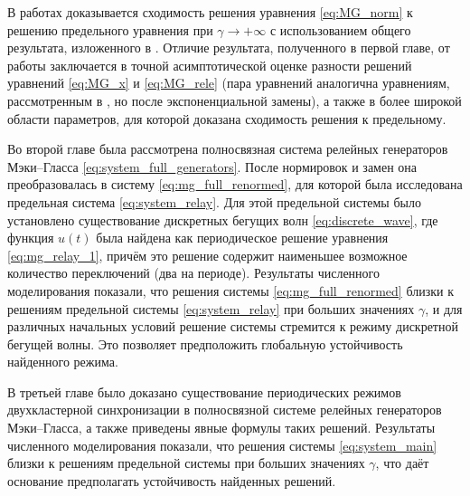 В работах \cite{Bartha2021, Krisztin2020} доказывается сходимость решения уравнения \eqref{eq:MG_norm} к решению предельного уравнения при $\gamma \to +\infty$ с использованием общего результата, изложенного в \cite[гл. XIV]{Diekmann1995}.
Отличие результата, полученного в первой главе, от работы \cite{Bartha2021} заключается в точной асимптотической оценке разности решений уравнений \eqref{eq:MG_x} и \eqref{eq:MG_rele} (пара уравнений аналогична уравнениям, рассмотренным в \cite{Bartha2021, Krisztin2020}, но после экспоненциальной замены), а также в более широкой области параметров, для которой доказана сходимость решения к предельному.

Во второй главе была рассмотрена полносвязная система релейных генераторов Мэки--Гласса \eqref{eq:system_full_generators}. После нормировок и замен она преобразовалась в систему \eqref{eq:mg_full_renormed}, для которой была исследована предельная система \eqref{eq:system_relay}. Для этой предельной системы было установлено существование дискретных бегущих волн \eqref{eq:discrete_wave}, где функция $u(t)$ была найдена как периодическое решение уравнения \eqref{eq:mg_relay_1}, причём это решение содержит наименьшее возможное количество переключений (два на периоде). Результаты численного моделирования показали, что решения системы \eqref{eq:mg_full_renormed} близки к решениям предельной системы \eqref{eq:system_relay} при больших значениях $\gamma$, и для различных начальных условий решение системы стремится к режиму дискретной бегущей волны. Это позволяет предположить глобальную устойчивость найденного режима.

В третьей главе было доказано существование периодических режимов двухкластерной синхронизации в полносвязной системе релейных генераторов Мэки--Гласса, а также приведены явные формулы таких решений. Результаты численного моделирования показали, что решения системы \eqref{eq:system_main} близки к решениям предельной системы при больших значениях $\gamma$, что даёт основание предполагать устойчивость найденных решений.





